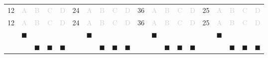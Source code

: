 \documentclass[a4paper,11pt]{article}
\newcommand{\light}[1]{\textcolor{lightgray}{#1}}
\begin{document}
\begin{center}
\begin{tabular}{r|c|c|c|c|r|c|c|c|c|r|c|c|c|c|r|c|c|c|c|}
\cline{2-5} \cline{7-10} \cline{12-15} \cline{17-20}
12& \light{A} & \light{B} & \light{C} & \light{D} & 24& \light{A} & \light{B} & \light{C} & \light{D} & 36& \light{A} & \light{B} & \light{C} & \light{D} & 25& \light{A} & \light{B} & \light{C} & \light{D}\\
\cline{2-5} \cline{7-10} \cline{12-15} \cline{17-20}
12& \light{A} & \light{B} & \light{C} & \light{D} & 24& \light{A} & \light{B} & \light{C} & \light{D} & 36& \light{A} & \light{B} & \light{C} & \light{D} & 25& \light{A} & \light{B} & \light{C} & \light{D}\\
\cline{2-5} \cline{7-10} \cline{12-15} \cline{17-20}
\multicolumn{1}{c}{} & \multicolumn{1}{c}{$\blacksquare$} & \multicolumn{1}{c}{} & \multicolumn{1}{c}{} & \multicolumn{1}{c}{} & \multicolumn{1}{c}{} & \multicolumn{1}{c}{$\blacksquare$} & \multicolumn{1}{c}{} & \multicolumn{1}{c}{} & \multicolumn{1}{c}{} & \multicolumn{1}{c}{} & \multicolumn{1}{c}{$\blacksquare$} & \multicolumn{1}{c}{} & \multicolumn{1}{c}{} & \multicolumn{1}{c}{} & \multicolumn{1}{c}{} & \multicolumn{1}{c}{$\blacksquare$} & \multicolumn{1}{c}{} & \multicolumn{1}{c}{} & \multicolumn{1}{c}{}\\ 
\multicolumn{1}{c}{} & \multicolumn{1}{c}{} & \multicolumn{1}{c}{$\blacksquare$} & \multicolumn{1}{c}{$\blacksquare$} & \multicolumn{1}{c}{$\blacksquare$} & \multicolumn{1}{c}{} & \multicolumn{1}{c}{} & \multicolumn{1}{c}{$\blacksquare$} & \multicolumn{1}{c}{$\blacksquare$} & \multicolumn{1}{c}{$\blacksquare$} & \multicolumn{1}{c}{} & \multicolumn{1}{c}{} & \multicolumn{1}{c}{$\blacksquare$} & \multicolumn{1}{c}{$\blacksquare$} & \multicolumn{1}{c}{$\blacksquare$} & \multicolumn{1}{c}{} & \multicolumn{1}{c}{} & \multicolumn{1}{c}{$\blacksquare$} & \multicolumn{1}{c}{$\blacksquare$} & \multicolumn{1}{c}{$\blacksquare$}\\ 
\end{tabular}
\end{center}
\end{document}
